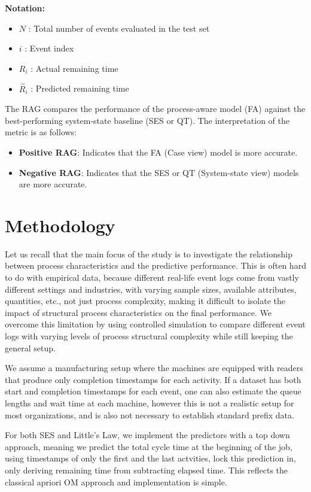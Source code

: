 \documentclass[
]{ceurart}
\begin{document}
\noindent\textbf{Notation:}
\begin{itemize}
    \item[] $N$ : Total number of events evaluated in the test set
    \item[] $i$ : Event index
    \item[] $R_i$ : Actual remaining time
    \item[] $\widehat{R}_i$ : Predicted remaining time
\end{itemize}

The RAG compares the performance of the process-aware model (FA) against the best-performing system-state baseline (SES or QT). The interpretation of the metric is as follows:
\begin{itemize}
    \item \textbf{Positive RAG}: Indicates that the FA (Case view) model is more accurate.
    \item \textbf{Negative RAG}: Indicates that the SES or QT (System-state view) models are more accurate.
\end{itemize}

\section{Methodology}
Let us recall that the main focus of the study is to investigate the relationship between process characteristics and the predictive performance. 
This is often hard to do with empirical data, because different real-life event logs come from vastly different settings and industries, 
with varying sample sizes, available attributes, quantities, etc., not just process complexity, making it difficult to isolate the impact of 
structural process characteristics on the final performance. We overcome this limitation by using controlled simulation to compare different event logs with varying levels of process structural complexity while still keeping the general setup.

We assume a manufacturing setup where the machines are equipped with readers that produce only completion timestamps for each activity. If a dataset has both start and completion 
timestamps for each event, one can also estimate the queue lengths and wait time at each machine, however this is not a realistic setup for most organizations, and is also not necessary to establish standard prefix data.

For both SES and Little's Law, we implement the predictors with a top down approach, meaning we predict the total cycle time at the beginning of the job, 
using timestamps of only the first and the last actvities, lock this prediction in, only deriving remaining time from subtracting elapsed time. This reflects the classical apriori OM approach and implementation is simple.
\end{document}
